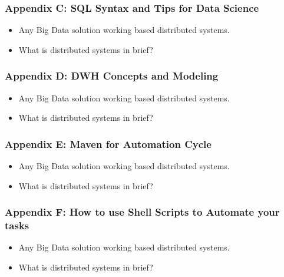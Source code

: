 
\begin{frame}
  \frametitle{Appendix C: SQL Syntax and Tips for Data Science}
	\begin{itemize}[<+->]
		\item Any Big Data solution working based distributed systems.
		\item What is distributed systems in brief?
	\end{itemize}
\end{frame}


\begin{frame}
  \frametitle{Appendix D: DWH Concepts and Modeling}
	\begin{itemize}[<+->]
		\item Any Big Data solution working based distributed systems.
		\item What is distributed systems in brief?
	\end{itemize}
\end{frame}


\begin{frame}
  \frametitle{Appendix E: Maven for Automation Cycle}
	\begin{itemize}[<+->]
		\item Any Big Data solution working based distributed systems.
		\item What is distributed systems in brief?
	\end{itemize}
\end{frame}


\begin{frame}
  \frametitle{Appendix F: How to use Shell Scripts to Automate your tasks}
	\begin{itemize}[<+->]
		\item Any Big Data solution working based distributed systems.
		\item What is distributed systems in brief?
	\end{itemize}
\end{frame}

